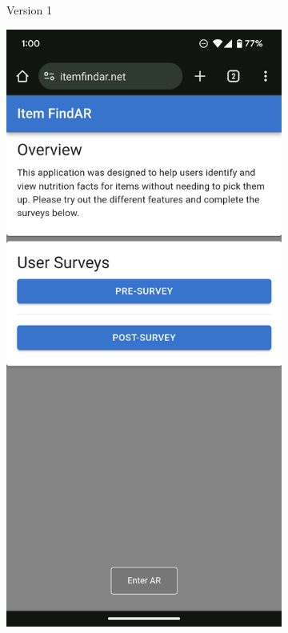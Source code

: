 \documentclass[thesis]{fputhesis}
\begin{document}
\begin{body}
\begin{figure}[h]
\begin{subfigure}[]{0.3\textwidth}
        \caption{Version 1}
        \label{fig:original}
    \end{subfigure}
    \begin{subfigure}[]{0.3\textwidth}
        \includegraphics[width=\textwidth]{Images/mainmenuv2.png}

\end{subfigure}
\end{figure}
\end{body}
\end{document}
